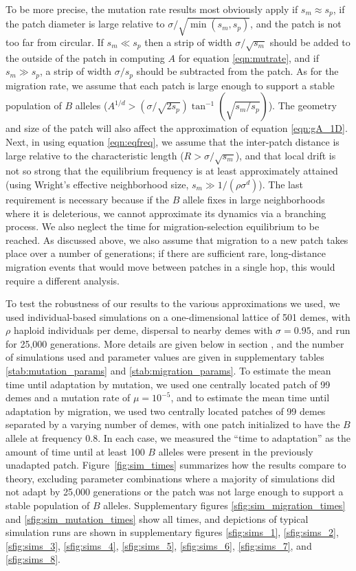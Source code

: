 \documentclass{article}
\newcommand{\revpoint}[2]{}
\newcommand{\secref}[1]{{\emph{\nameref{#1}}}}
\begin{document}
To be more precise, the mutation rate results most obviously apply if $s_m \approx s_p$,
if the patch diameter is large relative to $\sigma/\sqrt{\min(s_m,s_p)}$,
and the patch is not too far from circular.
If $s_m \ll s_p$ then a strip of width $\sigma/\sqrt{s_m}$
should be added to the outside of the patch in computing $A$ for equation \eqref{eqn:mutrate},
and if $s_m \gg s_p$, a strip of width $\sigma/s_p$ should be subtracted from the patch. \revpoint{2}{6}
As for the migration rate,
we assume that 
each patch is large enough to support a stable population of $B$ alleles
($A^{1/d} > (\sigma/\sqrt{2s_p}) \tan^{-1}(\sqrt{s_m/s_p})$).
The geometry and size of the patch will also affect the approximation of equation \eqref{eqn:gA_1D}.
Next, in using equation \eqref{eqn:eqfreq}, we assume that 
the inter-patch distance is large relative to the characteristic length
($R > \sigma/\sqrt{s_m}$),
and that
local drift is not so strong that the equilibrium frequency is at least approximately attained
(using Wright's effective neighborhood size, $s_m \gg 1/(\rho \sigma^d)$).
The last requirement is necessary because if the $B$ allele fixes in large neighborhoods where it is deleterious,
we cannot approximate its dynamics via a branching process.
We also neglect the time for migration-selection equilibrium to be reached.
As discussed above, we also assume that migration to a new patch takes place over a number of generations;
if there are sufficient rare, long-distance migration events
that would move between patches in a single hop,
this would require a different analysis.



To test the robustness of our results to the various approximations we used,
we used individual-based simulations on a one-dimensional lattice of 501 demes,
with $\rho$ haploid individuals per deme,
dispersal to nearby demes with $\sigma=0.95$,
and run for 25,000 generations. 
More details are given below in section \secref{ss:simulations},
and the number of simulations used and parameter values are given in
supplementary tables \ref{stab:mutation_params} and
\ref{stab:migration_params}. 
To estimate the mean time until adaptation by mutation,
we used one centrally located patch of 99 demes
and a mutation rate of $\mu=10^{-5}$,
and to estimate the mean time until adaptation by migration,
we used two centrally located patches of 99 demes
separated by a varying number of demes,
with one patch initialized to have the $B$ allele at frequency 0.8.
In each case, we measured the ``time to adaptation'' as the amount of time until at least 100 $B$ alleles
were present in the previously unadapted patch.
Figure~\ref{fig:sim_times}
summarizes how the results compare to theory,
excluding parameter combinations where a majority of simulations did not adapt by 25,000 generations
or the patch was not large enough to support a stable population of $B$ alleles.
Supplementary figures \ref{sfig:sim_migration_times} and \ref{sfig:sim_mutation_times} 
show all times, 
and depictions of typical simulation runs are shown in supplementary figures
\ref{sfig:sims_1}, \ref{sfig:sims_2}, \ref{sfig:sims_3}, \ref{sfig:sims_4}, \ref{sfig:sims_5}, \ref{sfig:sims_6}, \ref{sfig:sims_7}, and \ref{sfig:sims_8}.
\end{document}
